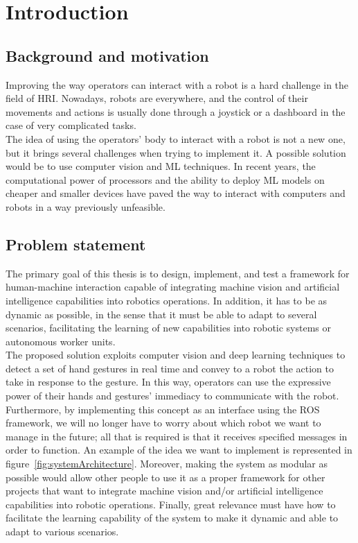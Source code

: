 \documentclass[../thesis.tex]{subfiles}
\begin{document}
\chapter{Introduction}\label{cap:introduction}

\section{Background and motivation}
Improving the way operators can interact with a robot is a hard challenge in the field of \gls{HRI}. Nowadays, robots are everywhere, and the control of their movements and actions is usually done through a joystick or a dashboard in the case of very complicated tasks.\\
The idea of using the operators' body to interact with a robot is not a new one, but it brings several challenges when trying to implement it. A possible solution would be to use computer vision and \gls{ML} techniques. In recent years, the computational power of processors and the ability to deploy \gls{ML} models on cheaper and smaller devices have paved the way to interact with computers and robots in a way previously unfeasible.

\section{Problem statement}
The primary goal of this thesis is to design, implement, and test a framework for human-machine interaction capable of integrating machine vision and artificial intelligence capabilities into robotics operations. In addition, it has to be as dynamic as possible, in the sense that it must be able to adapt to several scenarios, facilitating the learning of new capabilities into robotic systems or autonomous worker units.\\

The proposed solution exploits computer vision and deep learning techniques to detect a set of hand gestures in real time and convey to a robot the action to take in response to the gesture. In this way, operators can use the expressive power of their hands and gestures' immediacy to communicate with the robot. Furthermore, by implementing this concept as an interface using the \gls{ROS} framework, we will no longer have to worry about which robot we want to manage in the future; all that is required is that it receives specified messages in order to function. An example of the idea we want to implement is represented in figure~\ref{fig:systemArchitecture}. Moreover, making the system as modular as possible would allow other people to use it as a proper framework for other projects that want to integrate machine vision and/or artificial intelligence capabilities into robotic operations. Finally, great relevance must have how to facilitate the learning capability of the system to make it dynamic and able to adapt to various scenarios.
\end{document}
